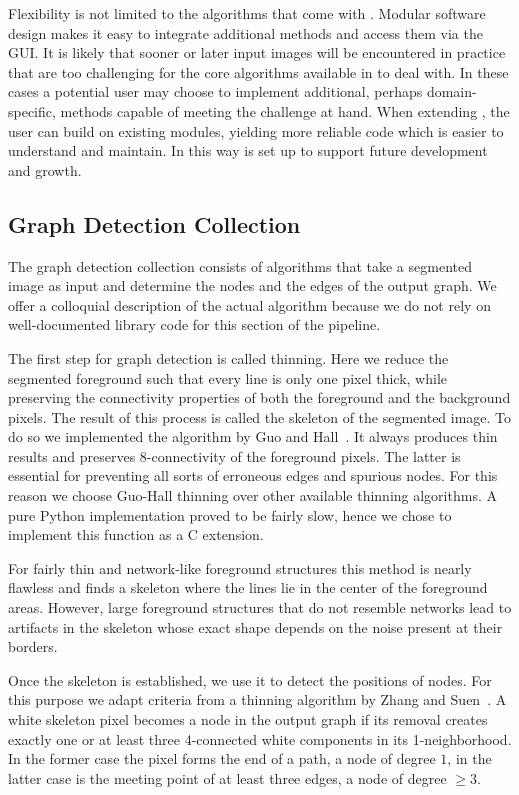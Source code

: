 		Flexibility is not limited to the algorithms that come with \NEFI. Modular software design makes it easy to integrate additional methods and access them via the GUI. It is likely that sooner or later input images will be encountered in practice that are too challenging for the core algorithms available in \NEFI to deal with. In these cases a potential user may choose to implement additional, perhaps domain-specific, methods capable of meeting the challenge at hand. When extending \NEFI, the user can build on existing modules, yielding more reliable code which is easier to understand and maintain. In this way \NEFI is set up to support future development and growth.

	\subsection{Graph Detection Collection} 

		The graph detection collection consists of algorithms that take a segmented image as input and determine the nodes and the edges of the output graph. We offer a colloquial description of the actual algorithm because we do not rely on well-documented library code for this section of the pipeline. 

		The first step for graph detection is called thinning. Here we reduce the segmented foreground such that every line is only one pixel thick, while preserving the connectivity properties of both the foreground and the background pixels. The result of this process is called the skeleton of the segmented image. To do so we implemented the algorithm by Guo and Hall~\cite{guo1989parallel}. It always produces thin results and preserves 8-connectivity of the foreground pixels. The latter is essential for preventing all sorts of erroneous edges and spurious nodes. For this reason we choose Guo-Hall thinning over other available thinning algorithms. A pure Python implementation proved to be fairly slow, hence we chose to implement this function as a C extension. 

		For fairly thin and network-like foreground structures this method is nearly flawless and finds a skeleton where the lines lie in the center of the foreground areas. However, large foreground structures that do not resemble networks lead to artifacts in the skeleton whose exact shape depends on the noise present at their borders.

		Once the skeleton is established, we use it to detect the positions of nodes. For this purpose we adapt criteria from a thinning algorithm by Zhang and Suen~\cite{zhang1984fast}. A white skeleton pixel becomes a node in the output graph if its removal creates exactly one or at least three 4-connected white components in its 1-neighborhood. In the former case the pixel forms the end of a path, \ie a node of degree $1$, in the latter case is the meeting point of at least three edges, \ie a node of degree $\ge 3$.

